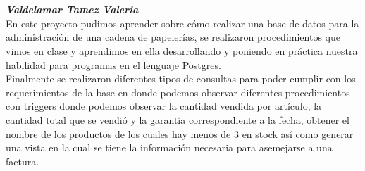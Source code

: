 \documentclass[letter,12pt]{article} %
\begin{document}
\\\\\textbf{\textit{Valdelamar Tamez Valeria}}
\\
En este proyecto pudimos aprender sobre cómo realizar una base de datos para la administración de una cadena de papelerías, se realizaron procedimientos que vimos en clase y aprendimos en ella desarrollando y poniendo en práctica nuestra habilidad para programas en el lenguaje Postgres.\\
Finalmente se realizaron diferentes tipos de consultas para poder cumplir con los requerimientos de la base en donde podemos observar diferentes procedimientos con triggers donde podemos observar la cantidad vendida por artículo, la cantidad total que se vendió y la garantía correspondiente a la fecha, obtener el nombre de los productos de los cuales hay menos de 3 en stock así como generar una vista en la cual se tiene la información necesaria para asemejarse a una factura.


		
\end{document}
